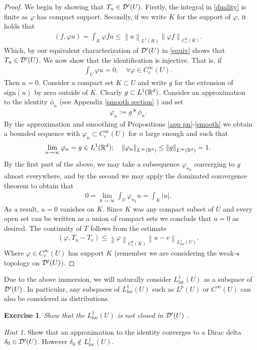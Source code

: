 \documentclass[12pt]{article}
\newtheorem{exercise}{Exercise}
\theoremstyle{remark}
\newtheorem*{hint}{Hint}
\renewcommand{\norm}[1]{\left\lVert #1 \right\rVert}\renewcommand{\abs}[1]{\left| #1 \right|}
\begin{document}
\begin{proof}
	We begin by showing that $T_u \in \mathcal{D} '(U)$. Firstly, the integral in \eqref{duality} is finite as $\varphi$ has compact support. Secondly, if we write $K$ for the support of  $\varphi$,   it holds that
	\begin{align*}
		(f,\varphi u)= \int_{K}\varphi f u \leq \norm{u}_{L^1(K)} \norm{\varphi f}_{C^0_c(K)} .
	\end{align*}
	Which, by our equivalent characterization of $\mathcal{D}'(U)$  in \eqref{equiv} shows that $T_u \in  \mathcal{D}'(U)$. We now show that the identification is injective.  That is, if
	\begin{align*}
		\int_{U}\varphi u=0 , \quad\forall \varphi \in C_c^\infty(U) .
	\end{align*}
	Then $u=0$. Consider a compact set $K \subset U$ and write  $g$ for the extension of $\mathrm{sign}(u) $ by zero outside of  $K$. Clearly $g \subset L^1(\mathbb{R}^d)$. Consider an approximation to the identity $\phi_n $ (see Appendix \ref{smooth section} ) and set
	\begin{align*}
		\varphi_n :=  g*\phi_n.
	\end{align*}
	By the approximation and smoothing of Propositions \ref{app pn}-\ref{smooth} we obtain a bounded sequence with $\varphi_n \subset C_c^\infty(U)$ for $n$ large enough and such that
	\begin{align*}
		\lim_{n \to \infty}\varphi_n =g \in L^1(\R^d) ; \quad \norm{\varphi_n}_{L^\infty(\R^d)} \leq \norm{g}_{L^\infty(\R^d)}=1.
	\end{align*}
	By the first part of the above, we may take a subsequence $\varphi_{n_k}$ converging to $g$ almost everywhere, and by the second we may apply the dominated convergence theorem to obtain that
	\begin{align*}
		0= \lim_{k \to \infty}\int_{U}\varphi_{n_k} u=\int_{K}\abs{u}.
	\end{align*}
	As a result, $u=0$ vanishes on  $K$. Since $K$ was any compact subset of $U$  and every open set can be written as a union of compact sets we conclude that $u=0$ as desired.
	The continuity of  $T$ follows from the estimate
	\begin{align*}
		(\varphi,T_{u} -T_v)\leq \norm{\varphi}_{C_c^k(K)}\norm{u-v}_{L^1_{\mathrm{loc}}(U)}.
	\end{align*}
	Where $\varphi \in C_c^\infty(U)$ has support $K$ (remember we are considering the weak-$\star$ topology on $\mathcal{D}'(U)$).
\end{proof}
Due to the above immersion, we will naturally consider $L^1_{\mathrm{loc}}(U)$ as a subspace of $\mathcal{D}'(U)$.    In particular, any subspaces of $L^1_{\mathrm{loc} }(U)$ such as $L^p(U)$ or  $C^\infty(U)$ can also be considered as distributions. \begin{exercise}
	Show that the $L^1_{\mathrm{loc}}(U)$ is not closed in $\mathcal{D}'(U)$  .\end{exercise}
\begin{hint}
	Show that an approximation to the identity converges to a Dirac delta $ \delta _0 \in \mathcal{D}'(U)$. However $\delta _0 \not\in L^1_{\mathrm{loc}}(U) $.
\end{hint}
\end{document}
